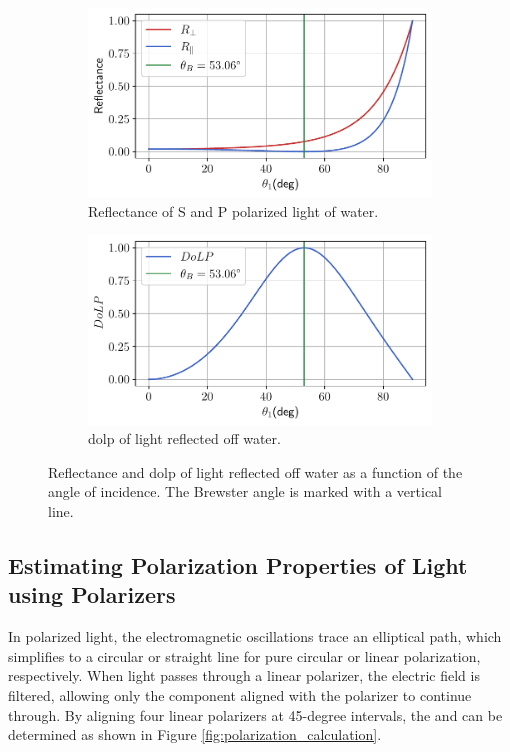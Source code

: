 \begin{figure}[H]
    \centering
    \begin{subfigure}{.5\textwidth}
        \centering
        \includegraphics[width=\textwidth]{figures/pol_plots/brewster0.pdf}
        \caption{Reflectance of S and P polarized light of water.}
        \label{fig:brewster0}
    \end{subfigure}%
    \begin{subfigure}{.5\textwidth}
        \centering
        \includegraphics[width=\textwidth]{figures/pol_plots/brewster1.pdf}
        \caption{\gls{dolp} of light reflected off water. \label{fig:dolp_graph}}
        \label{fig:brewster1}
    \end{subfigure}
    \caption{Reflectance and \gls{dolp} of light reflected off water as a function of the angle of incidence.
        The Brewster angle is marked with a vertical line.}
    \label{fig:test}
\end{figure}

\subsection{Estimating Polarization Properties of Light using Polarizers}
In polarized light, the electromagnetic oscillations trace an elliptical path, which simplifies to a circular or straight line for pure circular or linear polarization, respectively.
When light passes through a linear polarizer, the electric field is filtered, allowing only the component aligned with the polarizer to continue through.
By aligning four linear polarizers at 45-degree intervals, the  and  can be determined as shown in Figure \ref{fig:polarization_calculation}.

